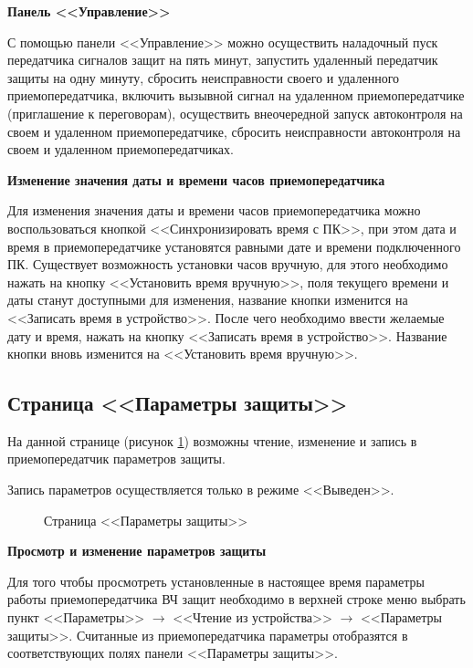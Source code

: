 \textbf{Панель <<Управление>>}

С помощью панели <<Управление>> можно осуществить наладочный пуск передатчика сигналов защит на пять минут, запустить удаленный передатчик защиты на одну минуту, сбросить неисправности своего и удаленного приемопередатчика, включить вызывной сигнал на удаленном приемопередатчике (приглашение к переговорам), осуществить внеочередной запуск автоконтроля на своем и удаленном приемопередатчике, сбросить неисправности автоконтроля на своем и удаленном приемопередатчиках.
\newline

\textbf{Изменение значения даты и времени часов приемопередатчика}

Для изменения значения даты и времени часов приемопередатчика можно воспользоваться кнопкой <<Синхронизировать время с ПК>>, при этом дата и время в приемопередатчике установятся равными дате и времени подключенного ПК. Существует возможность установки часов вручную, для этого необходимо нажать на кнопку <<Установить время вручную>>, поля текущего времени и даты станут доступными для изменения, название кнопки изменится на <<Записать время в устройство>>. После чего необходимо ввести желаемые дату и время, нажать на кнопку <<Записать время в устройство>>. Название кнопки вновь изменится на <<Установить время вручную>>. 


\subsection{Страница <<Параметры защиты>>}	\label{ssec:configurator_param_def}

На данной странице (рисунок \ref{fig:configurator_param_def}) возможны чтение, изменение и запись в приемопередатчик параметров защиты.

Запись параметров осуществляется только в режиме <<Выведен>>.

\begin{figure}[H]
	
	\caption{Страница <<Параметры защиты>>}
	\label{fig:configurator_param_def}
\end{figure}

\textbf{Просмотр и изменение параметров защиты}

Для того чтобы просмотреть установленные в настоящее время параметры работы приемопередатчика ВЧ защит необходимо в верхней строке меню выбрать пункт
<<Параметры>> $\rightarrow$ <<Чтение из устройства>> $\rightarrow$ <<Параметры защиты>>. Считанные из приемопередатчика параметры отобразятся в соответствующих полях панели <<Параметры защиты>>.

